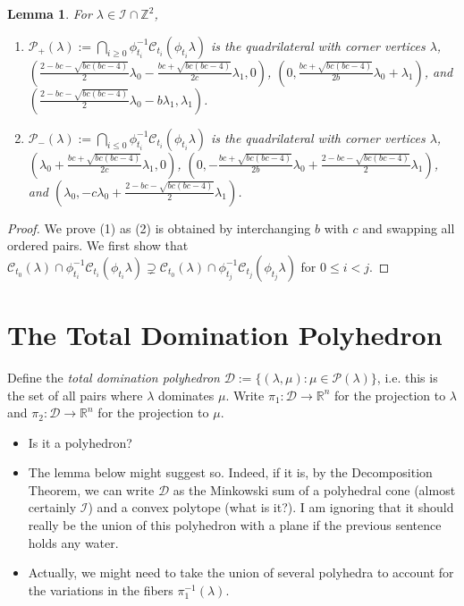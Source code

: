\documentclass{amsart}
\newtheorem{lemma}[theorem]{Lemma}
\numberwithin{theorem}{section}
\newcommand{\cC}{\mathcal{C}}
\newcommand{\cD}{\mathcal{D}}
\newcommand{\cI}{\mathcal{I}}
\newcommand{\cP}{\mathcal{P}}
\newcommand{\RR}{\mathbb{R}}
\newcommand{\ZZ}{\mathbb{Z}}
\begin{document}
  \begin{lemma}
    \label{le:one direction}
    For $\lambda\in\cI\cap\ZZ^2$, 
    \begin{enumerate}
      \item $\cP_+(\lambda):=\bigcap_{i \ge 0}\phi_{t_i}^{-1}\cC_{t_i}(\phi_{t_i}\lambda)$ is the quadrilateral with corner vertices $\lambda$, $(\frac{2-bc-\sqrt{bc(bc-4)}}{2}\lambda_0-\frac{bc+\sqrt{bc(bc-4)}}{2c}\lambda_1,0)$, $(0,\frac{bc+\sqrt{bc(bc-4)}}{2b}\lambda_0+\lambda_1)$, and $(\frac{2-bc-\sqrt{bc(bc-4)}}{2}\lambda_0-b\lambda_1,\lambda_1)$.
      \item $\cP_-(\lambda):=\bigcap_{i \le 0}\phi_{t_i}^{-1}\cC_{t_i}(\phi_{t_i}\lambda)$ is the quadrilateral with corner vertices $\lambda$, $(\lambda_0+\frac{bc+\sqrt{bc(bc-4)}}{2c}\lambda_1,0)$, $(0,-\frac{bc+\sqrt{bc(bc-4)}}{2b}\lambda_0+\frac{2-bc-\sqrt{bc(bc-4)}}{2}\lambda_1)$, and $(\lambda_0,-c\lambda_0+\frac{2-bc-\sqrt{bc(bc-4)}}{2}\lambda_1)$.
    \end{enumerate}
  \end{lemma}
  \begin{proof}
    We prove (1) as (2) is obtained by interchanging $b$ with $c$ and swapping all ordered pairs.  
    We first show that $\cC_{t_0}(\lambda) \cap \phi_{t_i}^{-1}\cC_{t_i}(\phi_{t_i}\lambda)\supsetneq \cC_{t_0}(\lambda) \cap \phi_{t_j}^{-1}\cC_{t_j}(\phi_{t_j}\lambda)$ for $0\le i<j$.
  \end{proof}
\section{The Total Domination Polyhedron}

  Define the \emph{total domination polyhedron} $\cD:=\{(\lambda,\mu):\mu\in\cP(\lambda)\}$, i.e. this is the set of all pairs where $\lambda$ dominates $\mu$.
  Write $\pi_1:\cD\to\RR^n$ for the projection to $\lambda$ and $\pi_2:\cD\to\RR^n$ for the projection to $\mu$.
  \begin{itemize}
    \item Is it a polyhedron?
    \item The lemma below might suggest so.  
      Indeed, if it is, by the Decomposition Theorem, we can write $\cD$ as the Minkowski sum of a polyhedral cone (almost certainly $\cI$) and a convex polytope (what is it?).
      I am ignoring that it should really be the union of this polyhedron with a plane if the previous sentence holds any water.
    \item Actually, we might need to take the union of several polyhedra to account for the variations in the fibers $\pi_1^{-1}(\lambda)$.
  \end{itemize}
\end{document}
